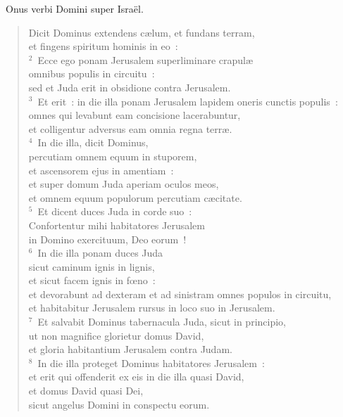 ~\lettrine[lines=10,image=true,loversize=0.05,lraise=-0.03]{O}{}nus verbi Domini super Isra\"el. \begin{flushleft}\begin{verse}\vspace{6pt}Dicit Dominus extendens c\ae lum, et fundans terram,\\ et fingens spiritum hominis in eo~:\\
${}^{2}$~Ecce ego ponam Jerusalem superliminare crapul\ae \\ omnibus populis in circuitu~:\\ sed et Juda erit in obsidione contra Jerusalem.\\
${}^{3}$~Et erit~: in die illa ponam Jerusalem lapidem oneris cunctis populis~:\\ omnes qui levabunt eam concisione lacerabuntur,\\ et colligentur adversus eam omnia regna terr\ae .\\
${}^{4}$~In die illa, dicit Dominus,\\ percutiam omnem equum in stuporem,\\ et ascensorem ejus in amentiam~:\\ et super domum Juda aperiam oculos meos,\\ et omnem equum populorum percutiam c\ae citate.\\
${}^{5}$~Et dicent duces Juda in corde suo~:\\ Confortentur mihi habitatores Jerusalem\\ in Domino exercituum, Deo eorum~!\\
${}^{6}$~In die illa ponam duces Juda\\ sicut caminum ignis in lignis,\\ et sicut facem ignis in fœno~:\\ et devorabunt ad dexteram et ad sinistram omnes populos in circuitu,\\ et habitabitur Jerusalem rursus in loco suo in Jerusalem.\\
${}^{7}$~Et salvabit Dominus tabernacula Juda, sicut in principio,\\ ut non magnifice glorietur domus David,\\ et gloria habitantium Jerusalem contra Judam.\\
${}^{8}$~In die illa proteget Dominus habitatores Jerusalem~:\\ et erit qui offenderit ex eis in die illa quasi David,\\ et domus David quasi Dei,\\ sicut angelus Domini in conspectu eorum.\end{verse}\end{flushleft}


